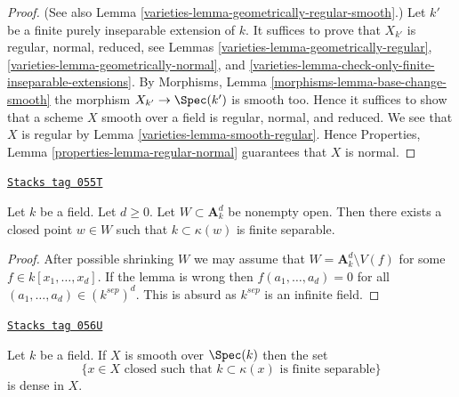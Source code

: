 \begin{proof}

(See also
Lemma \ref{varieties-lemma-geometrically-regular-smooth}.)
Let $k'$ be a finite purely inseparable extension of $k$.
It suffices to prove that $X_{k'}$ is regular, normal, reduced, see
Lemmas \ref{varieties-lemma-geometrically-regular},
\ref{varieties-lemma-geometrically-normal}, and
\ref{varieties-lemma-check-only-finite-inseparable-extensions}.
By
Morphisms, Lemma \ref{morphisms-lemma-base-change-smooth}
the morphism $X_{k'} \to \Spec(k')$ is smooth too.
Hence it suffices to show that a scheme $X$ smooth over a field is regular,
normal, and reduced. We see that $X$ is regular by
Lemma \ref{varieties-lemma-smooth-regular}.
Hence
Properties, Lemma \ref{properties-lemma-regular-normal}
guarantees that $X$ is normal.
\end{proof}

\begin{lemma}
\label{varieties-lemma-affine-space-over-field}
\href{https://stacks.math.columbia.edu/tag/055T}{\texttt{Stacks tag 055T}}

Let $k$ be a field. Let $d \geq 0$. Let $W \subset \mathbf{A}^d_k$
be nonempty open. Then there exists a closed point $w \in W$ such that
$k \subset \kappa(w)$ is finite separable.
\end{lemma}

\begin{proof}
After possible shrinking $W$ we may assume that
$W = \mathbf{A}^d_k \setminus V(f)$ for some $f \in k[x_1, \ldots, x_d]$.
If the lemma is wrong then $f(a_1, \ldots, a_d) = 0$ for all
$(a_1, \ldots, a_d) \in (k^{sep})^d$. This is absurd as $k^{sep}$
is an infinite field.
\end{proof}

\begin{lemma}
\label{varieties-lemma-smooth-separable-closed-points-dense}
\href{https://stacks.math.columbia.edu/tag/056U}{\texttt{Stacks tag 056U}}

Let $k$ be a field. If $X$ is smooth over $\Spec(k)$ then
the set
$$
\{x \in X\text{ closed such that }k \subset \kappa(x)
\text{ is finite separable}\}
$$
is dense in $X$.
\end{lemma}

